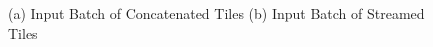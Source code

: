 \documentclass[10pt,twocolumn,letterpaper]{article}
\begin{document}
\begin{figure}[t]
\begin{center}
\end{center}
    \caption{(a) Input Batch of Concatenated Tiles (b) Input Batch of Streamed Tiles}
    \label{fig:tile format}
\end{figure}

\end{document}
